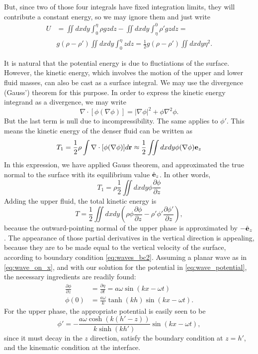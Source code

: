 But, since two of those four integrals have fixed integration limits,
they will contribute a constant energy, so we may ignore them and just
write
\begin{align*}
  U &=\iint dx dy   \int_{0}^\eta  \rho g z  dz   -
  \iint dx dy   \int_\eta^{0} \rho' g z dz = \\
  & g  (\rho-\rho')  \iint dx dy   \int_0^{\eta} z  dz =
  \frac 12 g  (\rho-\rho')  \iint dx dy \eta^2 .
\end{align*}

It is natural that the potential energy is due to fluctiations of the
surface. However, the kinetic energy, which involves the motion of the
upper and lower fluid masses, can also be cast as a surface integral.
We may use the divergence (Gauss') theorem for this purpose. In order
to express the kinetic energy integrand as a divergence, we may write
\[
  \nabla\cdot [ \phi (\nabla \phi) ]  =
  |\nabla \phi|^2 +
  \phi \nabla^2 \phi .
\]
But the last term is null due to incompressibility. The same applies
to $\phi'$. This means the kinetic energy of the denser fluid can be
written as
\[
  T_1 = \frac12 \rho \int \nabla\cdot [ \phi (\nabla \phi) ] d\mathbf{r} \approx
  \frac12 \iint dx dy \phi (\nabla \phi) \mathbf{e}_z
\]
In this expression, we have applied Gauss theorem, and approximated
the true normal to the surface with its equilibrium value $\hat{\mathbf{e}}_z$.
In other words,
\[
  T_1 = \rho 
  \frac12 \iint dx dy   \phi \frac{\partial \phi}{\partial z} 
\]
Adding the upper fluid, the total kinetic energy is
\[
  T = 
  \frac12 \iint dx dy
  \left(
    \rho \phi \frac{\partial \phi }{\partial z}
    -
    \rho'\phi'\frac{\partial \phi'}{\partial z}
  \right) ,
\]
because the outward-pointing normal of the upper phase is
approximated by $-\hat{\mathbf{e}}_z$.
The appearance of those partial derivatives in the vertical direction
is appealing, because they are to be made equal to the vertical
velocity of the surface, according to boundary condition
\ref{eq:waves_bc2}.
%
Assuming a planar wave as in \ref{eq:wave_on_x}, and with our solution
for the potential in \ref{eq:wave_potential}, the necessary ingredients
are readily found:
\begin{align*}
  \frac{\partial \phi }{\partial z} &= \frac{\partial \eta }{\partial t}=
                                      a \omega \sin(kx -\omega t)  \\
  \phi(0) &= \frac{a \omega  }{ k }  \tanh(kh) \sin(kx -\omega t ) .
\end{align*}
For the upper phase, the appropriate potential is easily seen to be
\[
  \phi' = - \frac{a \omega  \cosh(k( h' - z )) }{ k \sinh( kh' )  } \sin(kx -\omega t ) ,
\]
since it must decay in the $z$ direction, satisfy the boundary
condition at $z=h'$, and the kinematic condition at the interface.

